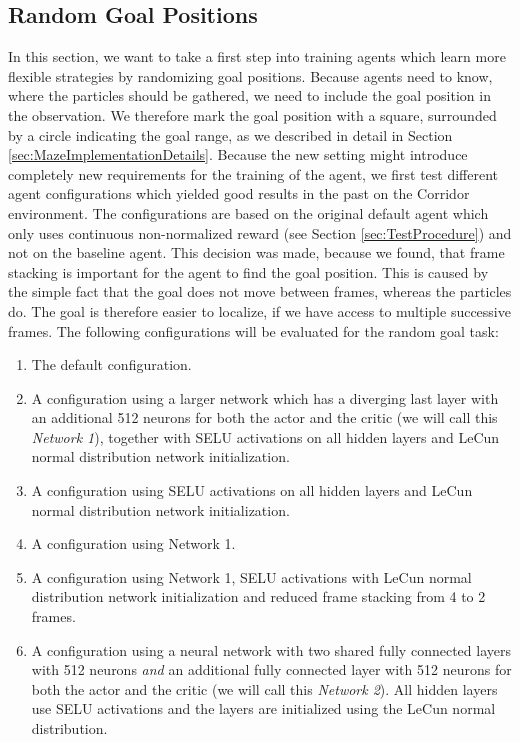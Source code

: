 \subsection{Random Goal Positions} \label{sec:EvalRandomGoals}
In this section, we want to take a first step into training agents which learn more flexible strategies by randomizing goal positions. Because agents need to know, where the particles should be gathered, we need to include the goal position in the observation. We therefore mark the goal position with a square, surrounded by a circle indicating the goal range, as we described in detail in Section \ref{sec:MazeImplementationDetails}. Because the new setting might introduce completely new requirements for the training of the agent, we first test different agent configurations which yielded good results in the past on the Corridor environment. The configurations are based on the original default agent which only uses continuous non-normalized reward (see Section \ref{sec:TestProcedure}) and not on the baseline agent. This decision was made, because we found, that frame stacking is important for the agent to find the goal position. This is caused by the simple fact that the goal does not move between frames, whereas the particles do. The goal is therefore easier to localize, if we have access to multiple successive frames. The following configurations will be evaluated for the random goal task:

\begin{enumerate}
    \item The default configuration. 
    \item A configuration using a larger network which has a diverging last layer with an additional 512 neurons for both the actor and the critic (we will call this \textit{Network 1}), together with SELU activations on all hidden layers and LeCun normal distribution network initialization. 
    \item A configuration using SELU activations on all hidden layers and LeCun normal distribution network initialization.
    \item A configuration using Network 1.
    \item A configuration using Network 1, SELU activations with LeCun normal distribution network initialization and reduced frame stacking from 4 to 2 frames.
    \item A configuration using a neural network with two shared fully connected layers with 512 neurons \textit{and} an additional fully connected layer with 512 neurons for both the actor and the critic (we will call this \textit{Network 2}). All hidden layers use SELU activations and the layers are initialized using the LeCun normal distribution.  
\end{enumerate}


